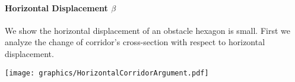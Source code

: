 \paragraph{Horizontal Displacement $\beta$}

We show the horizontal displacement of an obstacle hexagon is small.
First we analyze the change of corridor's cross-section with respect to horizontal displacement.



\begin{minipage}{\linewidth}
\begin{center}
\texttt{[image: graphics/HorizontalCorridorArgument.pdf]}
\label{fig:HorizontalCorridorArgument.pdf}
\end{center}
\end{minipage}

